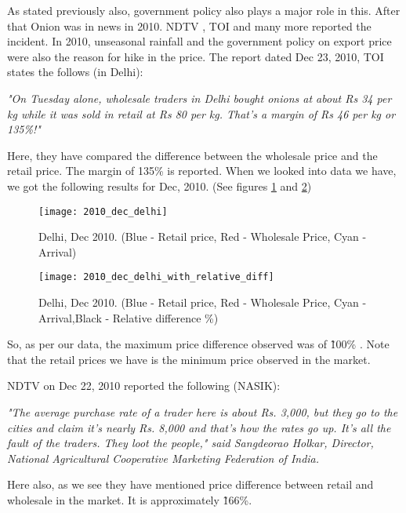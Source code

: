 As stated previously also, government policy also plays a major role in this. After that Onion was in news in 2010. NDTV \cite{Whyo17:online}, TOI \cite{Theg44:online} and many more reported the incident. In 2010, unseasonal rainfall and the government policy on export price were also the reason for hike in the price. The report dated Dec 23, 2010, TOI states the follows (in Delhi):

\textit{"On Tuesday alone, wholesale traders in Delhi bought onions at about Rs 34 per kg while it was sold in retail at Rs 80 per kg. That's a margin of Rs 46 per kg or 135\%!" }

Here, they have compared the difference between the wholesale price and the retail price. The margin of 135\% is reported. When we looked into data we have, we got the following results for Dec, 2010. (See figures \ref{fig:DelhiDec2010} and \ref{fig:DelhiDec2010Relativedifference})

\begin{figure}[h]
\begin{center}    
\texttt{[image: 2010\_dec\_delhi]}
\caption{Delhi, Dec 2010. (Blue - Retail price, Red - Wholesale Price, Cyan - Arrival)}
\label{fig:DelhiDec2010}
\end{center}
\end{figure}

\begin{figure}[h]
\begin{center}    
\texttt{[image: 2010\_dec\_delhi\_with\_relative\_diff]}
\caption{Delhi, Dec 2010. (Blue - Retail price, Red - Wholesale Price, Cyan - Arrival,Black - Relative difference \%)}
\label{fig:DelhiDec2010Relativedifference}
\end{center}
\end{figure}

So, as per our data, the maximum price difference observed was of \~ 100\% . Note that the retail prices we have is the minimum price observed in the market.

NDTV on Dec 22, 2010 reported the following (NASIK):

\textit{"The average purchase rate of a trader here is about Rs. 3,000, but they go to the cities and claim it's nearly Rs. 8,000 and that's how the rates go up. It's all the fault of the traders. They loot the people," said Sangdeorao Holkar, Director, National Agricultural Cooperative Marketing Federation of India.}

Here also, as we see they have mentioned price difference between retail and wholesale in the market. It is approximately \~166\%.

